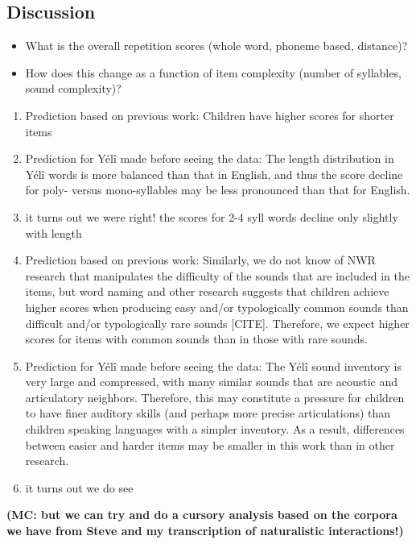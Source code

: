 \documentclass[english,,man,floatsintext]{apa6}
\begin{document}
\hypertarget{discussion}{%
\subsection{Discussion}\label{discussion}}

\begin{itemize}
\item
  What is the overall repetition scores (whole word, phoneme based, distance)?
\item
  How does this change as a function of item complexity (number of syllables, sound complexity)?
\end{itemize}

\begin{enumerate}
\def\labelenumi{\arabic{enumi}.}
\item
  Prediction based on previous work: Children have higher scores for shorter items
\item
  Prediction for Yélî made before seeing the data: The length distribution in Yélî words is more balanced than that in English, and thus the score decline for poly- versus mono-syllables may be less pronounced than that for English.
\item
  it turns out we were right! the scores for 2-4 syll words decline only slightly with length
\item
  Prediction based on previous work: Similarly, we do not know of NWR research that manipulates the difficulty of the sounds that are included in the items, but word naming and other research suggests that children achieve higher scores when producing easy and/or typologically common sounds than difficult and/or typologically rare sounds {[}CITE{]}. Therefore, we expect higher scores for items with common sounds than in those with rare sounds.
\item
  Prediction for Yélî made before seeing the data: The Yélî sound inventory is very large and compressed, with many similar sounds that are acoustic and articulatory neighbors. Therefore, this may constitute a pressure for children to have finer auditory skills (and perhaps more precise articulations) than children speaking languages with a simpler inventory. As a result, differences between easier and harder items may be smaller in this work than in other research.
\item
  it turns out we do see
\end{enumerate}

\textbf{(MC: but we can try and do a cursory analysis based on the corpora we have from Steve and my transcription of naturalistic interactions!)}
\end{document}
